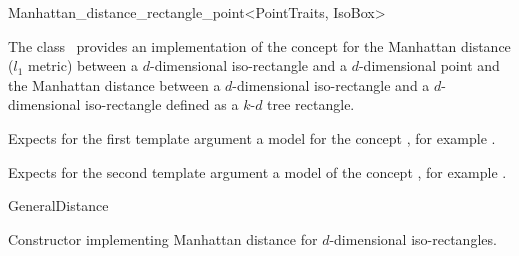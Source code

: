 

\begin{ccRefClass}{Manhattan_distance_rectangle_point<PointTraits, IsoBox>}  %


\ccDefinition
  
The class \ccRefName\ provides an implementation of
the  concept
for the Manhattan distance ($l_1$ metric)
between a $d$-dimensional iso-rectangle and a $d$-dimensional point 
and the Manhattan distance between a $d$-dimensional iso-rectangle
and a $d$-dimensional iso-rectangle defined as a $k$-$d$ tree rectangle.


\ccParameters
Expects for the first template argument
a model for the concept , for example .

Expects for the second template argument a model
of the concept ,
for example .


\ccIsModel

GeneralDistance

\ccTypes


\ccCreation
{}  %


{Constructor implementing Manhattan distance for
$d$-dimensional iso-rectangles.}


\end{ccRefClass}

